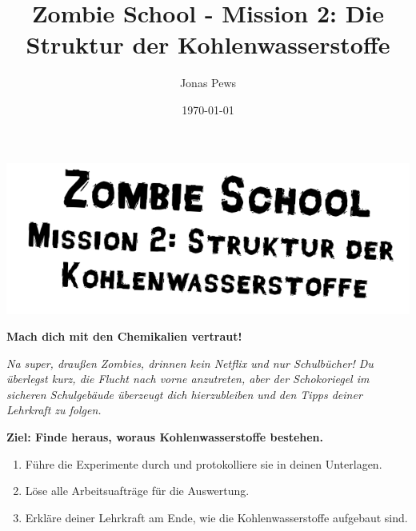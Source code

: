 \documentclass{scrartcl}  %
\author{Jonas Pews}
\title{Zombie School - Mission 2: Die Struktur der Kohlenwasserstoffe}
\date{\today}
\begin{document}
	\begin{center}
		\includegraphics{img/headline_ch_02_chStrukturKW}
	\end{center}	
	
	\begin{center}
		{\LARGE \textbf{Mach dich mit den Chemikalien vertraut!}}
	\end{center}
	
\vspace{0.7cm}	
	\textit{Na super, draußen Zombies, drinnen kein Netflix und nur Schulbücher! Du überlegst kurz, die Flucht nach vorne anzutreten, aber der Schokoriegel im sicheren Schulgebäude überzeugt dich hierzubleiben und den Tipps deiner Lehrkraft zu folgen.} \newline

\vspace{0.7cm}	

	\textbf{Ziel: Finde heraus, woraus Kohlenwasserstoffe bestehen.}
	\begin{enumerate}
		\item Führe die Experimente durch und protokolliere sie in deinen Unterlagen.
		\item Löse alle Arbeitsuafträge für die Auswertung. 
		\item Erkläre deiner Lehrkraft am Ende, wie die Kohlenwasserstoffe aufgebaut sind.
	\end{enumerate}
\end{document}
